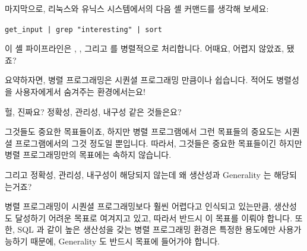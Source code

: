 	마지막으로, 리눅스와 유닉스 시스템에서의 다음 셸 커맨드를 생각해
	보세요:

	{\small \tt get\_input | grep "interesting" | sort}

	이 셸 파이프라인은 , , 그리고  를
	병렬적으로 처리합니다.
	어때요, 어렵지 않았죠, 됐죠?

	요약하자면, 병렬 프로그래밍은 시퀀셜 프로그래밍 만큼이나 쉽습니다.
	적어도 병렬성을 사용자에게서 숨겨주는 환경에서는요!

\QuickQ{}
	헐, 진짜요? 정확성, 관리성, 내구성 같은 것들은요?

\QuickA{}
	그것들도 중요한 목표들이죠, 하지만 병렬 프로그램에서 그런 목표들의
	중요도는 시퀀셜 프로그램에서의 그것 정도일 뿐입니다.  따라서, 그것들은
	중요한 목표들이긴 하지만 병렬 프로그래밍만의 목표에는 속하지 않습니다.

\QuickQ{}
	그리고 정확성, 관리성, 내구성이 해당되지 않는데 왜 생산성과 Generality
	는 해당되는거죠?

\QuickA{}
	병렬 프로그래밍이 시퀀셜 프로그래밍보다 훨씬 어렵다고 인식되고
	있는만큼, 생산성도 달성하기 어려운 목표로 여겨지고 있고, 따라서 반드시
	이 목표를 이뤄야 합니다.
	또한, SQL 과 같이 높은 생산성을 갖는 병렬 프로그래밍 환경은 특정한
	용도에만 사용가능하기 때문에, Generality 도 반드시 목표에 들어가야
	합니다.

